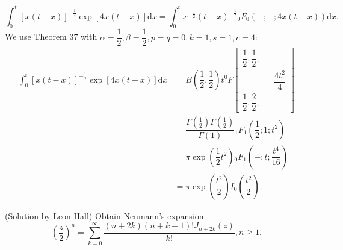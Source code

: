 \begin{solution}
$$\displaystyle\int_0^t [x(t-x)]^{-\frac{1}{2}} \exp[4x(t-x)]\mathrm{d}x = \displaystyle\int_0^t x^{-\frac{1}{2}}(t-x)^{-\frac{1}{2}} {}_0F_0(-;-;4x(t-x))\mathrm{d}x.$$
We use Theorem 37 with $\alpha = \dfrac{1}{2}, \beta = \dfrac{1}{2}, p=q=0, k=1, s=1, c=4:$
$$\begin{array}{ll}
\displaystyle\int_0^t [x(t-x)]^{-\frac{1}{2}} \exp[4x(t-x)]\mathrm{d}x &= B \left( \dfrac{1}{2}, \dfrac{1}{2} \right) t^0 F \left[ \begin{array}{rlr}
\dfrac{1}{2}, \dfrac{1}{2}; & & \\
& & \dfrac{4t^2}{4} \\
\dfrac{1}{2}, \dfrac{2}{2}; & & 
\end{array} \right] \\
&= \dfrac{\Gamma(\frac{1}{2}) \Gamma(\frac{1}{2})}{\Gamma(1)} {}_1F_1 \left( \dfrac{1}{2}; 1 ; t^2 \right) \\
&= \pi \exp \left( \dfrac{1}{2}t^2 \right) {}_0F_1 \left(-;t; \dfrac{t^4}{16} \right) \\
&= \pi \exp \left( \dfrac{t^2}{2} \right) I_0 \left( \dfrac{t^2}{2} \right).
\end{array}$$
\end{solution}
\begin{problem} \label{problem22chapter6}(Solution by Leon Hall)
Obtain Neumann's expansion
$$\left( \dfrac{z}{2} \right)^n = \displaystyle\sum_{k=0}^{\infty} \dfrac{(n+2k)(n+k-1)!J_{n+2k}(z)}{k!}, n \geq 1.$$
\end{problem}
